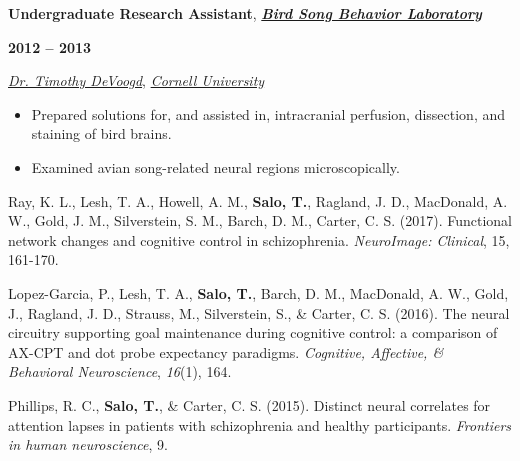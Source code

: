 \documentclass[10pt]{article}
\newcommand{\sectionstyle}{\LARGE \fontfamily{lmr}\selectfont}
\begin{document}
\bigskip

\begin{minipage}[t]{.85\linewidth}
\flushleft
\noindent
\textbf{Undergraduate Research Assistant},
\href{http://people.psych.cornell.edu/~devoogdlab/}{\emph{\textbf{Bird Song Behavior Laboratory}}}
\end{minipage}
\hfill
\begin{minipage}[t]{.15\linewidth}
\flushright
\noindent
\textsc{\textbf{2012 -- 2013}}
\end{minipage}

\href{http://www.psych.cornell.edu/people/faculty/devoogd-profile/}{\emph{Dr. Timothy DeVoogd}},
\href{http://www.cornell.edu}{\emph{Cornell University}}

\begin{itemize}[noitemsep, nolistsep]
\item
  Prepared solutions for, and assisted in, intracranial perfusion,
  dissection, and staining of bird brains.
\item
  Examined avian song-related neural regions microscopically.
\end{itemize}

\newpage

\begin{center}\sectionstyle{PUBLICATIONS}\end{center}

\begin{hangparas}{.25in}{1}
Ray, K. L., Lesh, T. A., Howell, A. M., \textbf{Salo, T.}, Ragland, J. D.,
MacDonald, A. W., Gold, J. M., Silverstein, S. M., Barch, D. M., Carter,
C. S. (2017). Functional network changes and cognitive control in schizophrenia.
\emph{NeuroImage: Clinical}, 15, 161-170.

\bigskip

Lopez-Garcia, P., Lesh, T. A., \textbf{Salo, T.}, Barch, D. M., MacDonald,
A. W., Gold, J., Ragland, J. D., Strauss, M., Silverstein, S., \& Carter, C. S.
(2016). The neural circuitry supporting goal maintenance during cognitive
control: a comparison of AX-CPT and dot probe expectancy paradigms.
\emph{Cognitive, Affective, \& Behavioral Neuroscience}, \emph{16}(1), 164.

\bigskip

Phillips, R. C., \textbf{Salo, T.}, \& Carter, C. S. (2015). Distinct neural
correlates for attention lapses in patients with schizophrenia and healthy
participants. \emph{Frontiers in human neuroscience}, 9.
\end{hangparas}
\end{document}
